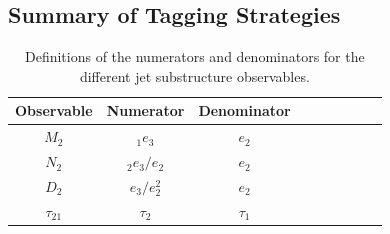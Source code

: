 \documentclass[11pt]{cernrep}
\begin{document}
\subsection{Summary of Tagging Strategies}\label{jetsub_2prong_sec:dichroic_sum}



\begin{table}
\begin{center}
\begin{tabular}{| c | c | c |c |c|c|c |c|r| }
  \hline                       
  Observable &  Numerator & Denominator \\
  \hline
  $M_2$ &   $_{1}e_{3}$ & $ e_{2}$ \\
  $N_2$ &   $_{2}e_{3} / e_{2} $ & $ e_{2}$ \\
  $D_2$ &   $e_{3} / e_{2}^2 $ & $ e_{2}$ \\
  $\tau_{21}$ &   $\tau_2$ & $\tau_1$ \\
  \hline  
\end{tabular}
\end{center}
\caption{
Definitions of the numerators and denominators for the different jet substructure observables.
}
\label{jetsub_2prong_tab:dn}
\end{table}
\end{document}
